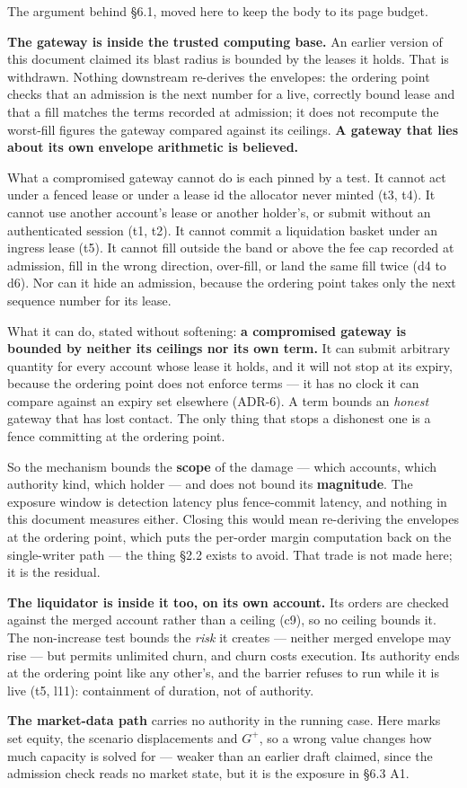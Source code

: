\documentclass[10pt,a4paper]{article}
\begin{document}
The argument behind §6.1, moved here to keep the body to its page budget.

\textbf{The gateway is inside the trusted computing base.} An earlier version of this
document claimed its blast radius is bounded by the leases it holds. That is
withdrawn. Nothing downstream re-derives the envelopes: the ordering point checks
that an admission is the next number for a live, correctly bound lease and that a
fill matches the terms recorded at admission; it does not recompute the
worst-fill figures the gateway compared against its ceilings. \textbf{A gateway that
lies about its own envelope arithmetic is believed.}

What a compromised gateway cannot do is each pinned by a test. It cannot act
under a fenced lease or under a lease id the allocator never minted (t3, t4). It
cannot use another account's lease or another holder's, or submit without an
authenticated session (t1, t2). It cannot commit a liquidation basket under an
ingress lease (t5). It cannot fill outside the band or above the fee cap
recorded at admission, fill in the wrong direction, over-fill, or land the same
fill twice (d4 to d6). Nor can it hide an admission, because the ordering point
takes only the next sequence number for its lease.

What it can do, stated without softening: \textbf{a compromised gateway is bounded by
neither its ceilings nor its own term.} It can submit arbitrary quantity for
every account whose lease it holds, and it will not stop at its expiry, because
the ordering point does not enforce terms --- it has no clock it can compare
against an expiry set elsewhere (ADR-6). A term bounds an \emph{honest} gateway that
has lost contact. The only thing that stops a dishonest one is a fence
committing at the ordering point.

So the mechanism bounds the \textbf{scope} of the damage --- which accounts, which
authority kind, which holder --- and does not bound its \textbf{magnitude}. The exposure
window is detection latency plus fence-commit latency, and nothing in this
document measures either. Closing this would mean re-deriving
the envelopes at the ordering point, which puts the per-order margin computation
back on the single-writer path --- the thing §2.2 exists to avoid. That trade is
not made here; it is the residual.

\textbf{The liquidator is inside it too, on its own account.} Its orders are checked
against the merged account rather than a ceiling (c9), so no ceiling bounds it.
The non-increase test bounds the \emph{risk} it creates --- neither merged envelope may
rise --- but permits unlimited churn, and churn costs execution. Its authority ends
at the ordering point like any other's, and the barrier refuses to run while it
is live (t5, l11): containment of duration, not of authority.

\textbf{The market-data path} carries no authority in the running case. Here marks set
equity, the scenario displacements and \(G^{+}\), so a wrong value changes how much
capacity is solved for --- weaker than an earlier draft claimed, since the
admission check reads no market state, but it is the exposure in §6.3 A1.



\label{start:16}%
\end{document}
